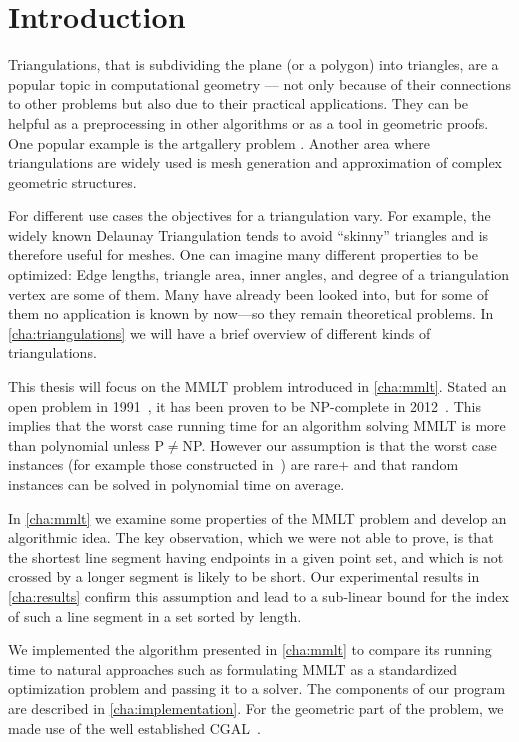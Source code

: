 \chapter{Introduction}
Triangulations, that is subdividing the plane (or a polygon) into
triangles, are a popular topic in computational geometry --- not
only because of their connections to other problems but also due to
their practical applications. They can be helpful as a preprocessing 
in other algorithms
or as a tool in geometric proofs. One popular example is the
artgallery problem \cite{artgallery}. Another area where triangulations
are widely used is mesh generation and approximation of complex
geometric structures. \cite{meshing}

For different use cases the objectives for a triangulation vary. For
example, the widely known Delaunay Triangulation
\cite[Section 9.2]{deberg_compgeom} tends to avoid ``skinny''
triangles and is therefore useful for meshes. One can imagine many
different properties to be optimized: Edge lengths, triangle area,
inner angles, and degree of a triangulation vertex are some of them. 
Many have already
been looked into, but for some of them no application is known by
now---so they remain theoretical problems. In \cref{cha:triangulations} 
we will have a brief overview of different
kinds of triangulations.

This thesis will focus on the \gls{MMLT} problem introduced in \cref{cha:mmlt}.
Stated an open problem in 1991~\cite{triangulation_minmax_length}, 
it has been proven to be NP-complete in 2012~\cite{mmlt_complexity}. 
This implies that the worst case running time for an algorithm solving
\gls{MMLT} is more than polynomial unless P\(\not=\)NP.
However our assumption is that the worst case instances (for example
those constructed in~\cite{mmlt_complexity}) are rare+
and that random instances can be solved in polynomial time on average. 

In \cref{cha:mmlt} we examine some properties of the \gls{MMLT}
problem and develop an algorithmic idea. The key observation, which we
were not able to prove, is that the shortest line segment having endpoints
in a given point set, and which is not crossed by a longer segment is likely
to be short. Our experimental results in \cref{cha:results} confirm this
assumption and lead to a sub-linear bound for the index of such a line segment
in a set sorted by length.

We implemented the algorithm presented in \cref{cha:mmlt} to compare
its running time to natural approaches such as formulating \gls{MMLT}
as a standardized optimization problem and passing it to a solver. The
components of our program are described in \cref{cha:implementation}.
For the geometric part of the problem, we made use of the well
established \gls{CGAL}~\cite{cgal}.

